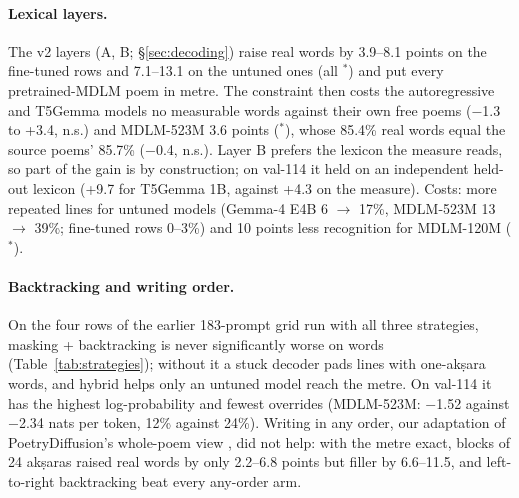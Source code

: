 \documentclass[11pt]{article}
\newcommand{\sig}{$^{\ast}$}
\begin{document}
\paragraph{Lexical layers.} The v2 layers (A, B; \S\ref{sec:decoding}) raise real words by 3.9--8.1 points on the
fine-tuned rows and 7.1--13.1 on the untuned ones (all \sig) and put every pretrained-MDLM poem in metre. The
constraint then costs the autoregressive and T5Gemma models no measurable words against their own free poems
($-$1.3 to +3.4, n.s.) and MDLM-523M 3.6 points (\sig), whose 85.4\% real words equal the source poems' 85.7\%
($-$0.4, n.s.). Layer B prefers the lexicon the measure reads, so part of the gain is by construction; on val-114 it
held on an independent held-out lexicon (+9.7 for T5Gemma 1B, against +4.3 on the measure). Costs: more repeated
lines for untuned models (Gemma-4 E4B 6 $\to$ 17\%, MDLM-523M 13 $\to$ 39\%; fine-tuned rows 0--3\%) and 10 points
less recognition for MDLM-120M (\sig).

\paragraph{Backtracking and writing order.} On the four rows of the earlier 183-prompt grid run with all three
strategies, masking + backtracking is never significantly worse on words (Table~\ref{tab:strategies}); without it
a stuck decoder pads lines with one-akṣara words, and hybrid helps only an untuned model reach the metre. On
val-114 it has the highest log-probability and fewest overrides (MDLM-523M: $-$1.52 against $-$2.34 nats per token,
12\% against 24\%). Writing in any order, our
adaptation of PoetryDiffusion's whole-poem view \citep{hu2024poetrydiffusion}, did not help: with the metre exact,
blocks of 24 akṣaras raised real words by only 2.2--6.8 points but filler by 6.6--11.5, and left-to-right
backtracking beat every any-order arm.
\end{document}
